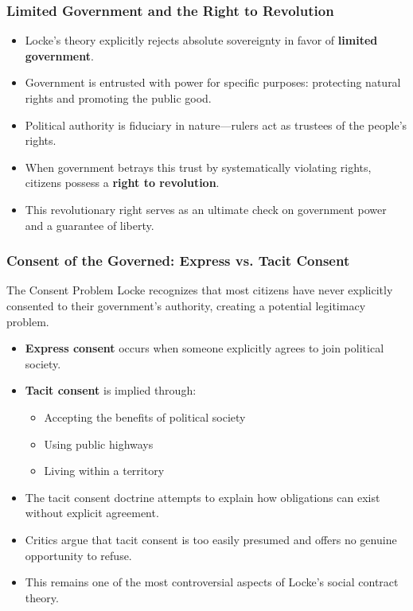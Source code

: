 \documentclass[aspectratio=169]{beamer}
\begin{document}
\begin{frame}
  \frametitle{Limited Government and the Right to Revolution}
  
  \begin{itemize}
    \item Locke's theory explicitly rejects absolute sovereignty in favor of \textbf{limited government}.
    \item Government is entrusted with power for specific purposes: protecting natural rights and promoting the public good.
    \item Political authority is fiduciary in nature—rulers act as trustees of the people's rights.
    \item When government betrays this trust by systematically violating rights, citizens possess a \textbf{right to revolution}.
    \item This revolutionary right serves as an ultimate check on government power and a guarantee of liberty.
  \end{itemize}
\end{frame}

\begin{frame}
  \frametitle{Consent of the Governed: Express vs. Tacit Consent}
  
  \begin{alertblock}{The Consent Problem}
    Locke recognizes that most citizens have never explicitly consented to their government's authority, creating a potential legitimacy problem.
  \end{alertblock}
  
  \begin{itemize}
    \item \textbf{Express consent} occurs when someone explicitly agrees to join political society.
    \item \textbf{Tacit consent} is implied through:
      \begin{itemize}
        \item Accepting the benefits of political society
        \item Using public highways
        \item Living within a territory
      \end{itemize}
    \item The tacit consent doctrine attempts to explain how obligations can exist without explicit agreement.
    \item Critics argue that tacit consent is too easily presumed and offers no genuine opportunity to refuse.
    \item This remains one of the most controversial aspects of Locke's social contract theory.
  \end{itemize}
\end{frame}
\end{document}
